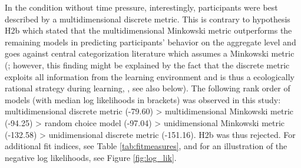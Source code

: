 \documentclass[a4paper,man,natbib]{apa6}
\begin{document}
In the condition without time pressure, interestingly, participants were best described by a multidimensional discrete metric. This is contrary to hypothesis H2b which stated that the multidimensional Minkowski metric outperforms the remaining models in predicting participants' behavior on the aggregate level and goes against central categorization literature which assumes a Minkowski metric (\citealp{nosofsky1986attention, nosofsky1989further, smith1998prototypes, nosofsky1994rule, nosofsky1984choice}; however, this finding might be explained by the fact that the discrete metric exploits all information from the learning environment and is thus a ecologically rational strategy during learning, \citealp{todd2007environments}, see also below).
The following rank order of models (with median log likelihoods in brackets) was observed in this study: multidimensional discrete metric (-79.60) > multidimensional Minkowski metric (-94.25) > random choice model (-97.04) > unidimensional Minkowski metric (-132.58) > unidimensional discrete metric (-151.16). H2b was thus rejected. For additional fit indices, see Table \ref{tab:fitmeasures}, and for an illustration of the negative log likelihoods, see Figure \ref{fig:log_lik}.
\end{document}
